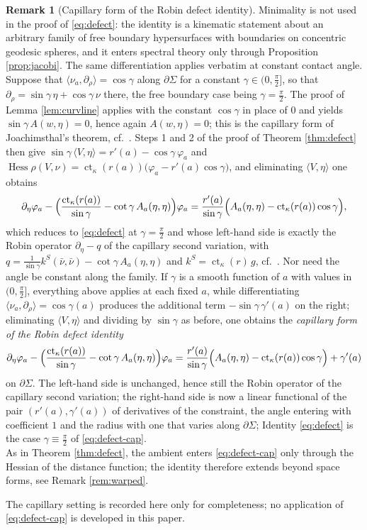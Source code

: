 \documentclass[11pt,a4paper]{amsart}
\theoremstyle{plain}
\theoremstyle{definition}
\newtheorem{remark}[theorem]{Remark}
\newcommand{\ct}{\operatorname{ct}_\kappa}
\newcommand{\Hess}{\operatorname{Hess}}
\begin{document}
\begin{remark}[Capillary form of the Robin defect identity]\label{rem:kinematic}
Minimality is not used in the proof of \eqref{eq:defect}: the identity is a kinematic statement about an arbitrary family of free boundary hypersurfaces with boundaries on concentric geodesic spheres, and it enters spectral theory only through Proposition \ref{prop:jacobi}. The same differentiation applies verbatim at constant contact angle. Suppose that $\langle\nu_a,\partial_\rho\rangle=\cos\gamma$ along $\partial\Sigma$ for a constant $\gamma\in(0,\tfrac\pi2]$, so that $\partial_\rho=\sin\gamma\,\eta+\cos\gamma\,\nu$ there, the free boundary case being $\gamma=\tfrac\pi2$. The proof of Lemma \ref{lem:curvline} applies with the constant $\cos\gamma$ in place of $0$ and yields $\sin\gamma\,A(w,\eta)=0$, hence again $A(w,\eta)=0$; this is the capillary form of Joachimsthal's theorem, cf.\ \cite[Lem. 2.5]{NZ1}. Steps 1 and 2 of the proof of Theorem \ref{thm:defect} then give $\sin\gamma\,\langle V,\eta\rangle=r'(a)-\cos\gamma\,\varphi_a$ and $\Hess\rho(V,\nu)=\ct(r(a))\bigl(\varphi_a-r'(a)\cos\gamma\bigr)$, and eliminating $\langle V,\eta\rangle$ one obtains
\[
\partial_\eta\varphi_a-\Bigl(\frac{\ct(r(a))}{\sin\gamma}-\cot\gamma\,A_a(\eta,\eta)\Bigr)\varphi_a=\frac{r'(a)}{\sin\gamma}\Bigl(A_a(\eta,\eta)-\ct(r(a))\cos\gamma\Bigr),
\]
which reduces to \eqref{eq:defect} at $\gamma=\tfrac\pi2$ and whose left-hand side is exactly the Robin operator $\partial_\eta-q$ of the capillary second variation, with $q=\frac{1}{\sin\gamma}k^{S}(\bar\nu,\bar\nu)-\cot\gamma\,A_a(\eta,\eta)$ and $k^{S}=\ct(r)\,g$, cf.\ \cite[\S 2.3]{NZ1}. Nor need the angle be constant along the family. If $\gamma$ is a smooth function of $a$ with values in $(0,\tfrac\pi2]$, everything above applies at each fixed $a$, while differentiating $\langle\nu_a,\partial_\rho\rangle=\cos\gamma(a)$ produces the additional term $-\sin\gamma\,\gamma'(a)$ on the right; eliminating $\langle V,\eta\rangle$ and dividing by $\sin\gamma$ as before, one obtains the \emph{capillary form of the Robin defect identity}
\begin{equation}\label{eq:defect-cap}
\partial_\eta\varphi_a-\Bigl(\frac{\ct(r(a))}{\sin\gamma}-\cot\gamma\,A_a(\eta,\eta)\Bigr)\varphi_a=\frac{r'(a)}{\sin\gamma}\Bigl(A_a(\eta,\eta)-\ct(r(a))\cos\gamma\Bigr)+\gamma'(a)
\end{equation}
on $\partial\Sigma$. The left-hand side is unchanged, hence still the Robin operator of the capillary second variation; the right-hand side is now a linear functional of the pair $(r'(a),\gamma'(a))$ of derivatives of the constraint, the angle entering with coefficient $1$ and the radius with one that varies along $\partial\Sigma$; Identity \eqref{eq:defect} is the case $\gamma\equiv\tfrac\pi2$ of \eqref{eq:defect-cap}.
\\
As in Theorem \ref{thm:defect}, the ambient enters \eqref{eq:defect-cap} only through the Hessian of the distance function; the identity therefore extends beyond space forms, see Remark \ref{rem:warped}.

\noindent The capillary setting is recorded here only for completeness; no application of \eqref{eq:defect-cap} is developed in this paper.
\end{remark}
\end{document}

